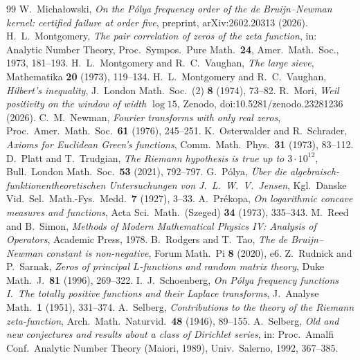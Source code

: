 \documentclass[11pt]{amsart}
\theoremstyle{definition}
\theoremstyle{remark}
\numberwithin{equation}{section}
\begin{document}
\begin{thebibliography}{99}
 W.~Micha{\l}owski, \emph{On the P\'olya frequency order of the de Bruijn--Newman kernel: certified failure at order five}, preprint, arXiv:2602.20313 (2026).
 H.~L.~Montgomery, \emph{The pair correlation of zeros of the zeta function}, in: Analytic Number Theory, Proc.\ Sympos.\ Pure Math.\ \textbf{24}, Amer.\ Math.\ Soc., 1973, 181--193.
 H.~L.~Montgomery and R.~C.~Vaughan, \emph{The large sieve}, Mathematika \textbf{20} (1973), 119--134.
 H.~L.~Montgomery and R.~C.~Vaughan, \emph{Hilbert's inequality}, J.\ London Math.\ Soc.\ (2) \textbf{8} (1974), 73--82.
 R.~Mori, \emph{Weil positivity on the window of width $\log 15$}, Zenodo, doi:10.5281/zenodo.23281236 (2026).
 C.~M.~Newman, \emph{Fourier transforms with only real zeros}, Proc.\ Amer.\ Math.\ Soc.\ \textbf{61} (1976), 245--251.
 K.~Osterwalder and R.~Schrader, \emph{Axioms for Euclidean Green's functions}, Comm.\ Math.\ Phys.\ \textbf{31} (1973), 83--112.
 D.~Platt and T.~Trudgian, \emph{The Riemann hypothesis is true up to $3\cdot10^{12}$}, Bull.\ London Math.\ Soc.\ \textbf{53} (2021), 792--797.
 G.~P\'olya, \emph{\"Uber die algebraisch-funktionentheoretischen Untersuchungen von J.~L.~W.~V.~Jensen}, Kgl.\ Danske Vid.\ Sel.\ Math.-Fys.\ Medd.\ \textbf{7} (1927), 3--33.
 A.~Pr\'ekopa, \emph{On logarithmic concave measures and functions}, Acta Sci.\ Math.\ (Szeged) \textbf{34} (1973), 335--343.
 M.~Reed and B.~Simon, \emph{Methods of Modern Mathematical Physics IV: Analysis of Operators}, Academic Press, 1978.
 B.~Rodgers and T.~Tao, \emph{The de Bruijn--Newman constant is non-negative}, Forum Math.\ Pi \textbf{8} (2020), e6.
 Z.~Rudnick and P.~Sarnak, \emph{Zeros of principal $L$-functions and random matrix theory}, Duke Math.\ J.\ \textbf{81} (1996), 269--322.
 I.~J.~Schoenberg, \emph{On P\'olya frequency functions I.\ The totally positive functions and their Laplace transforms}, J.\ Analyse Math.\ \textbf{1} (1951), 331--374.
 A.~Selberg, \emph{Contributions to the theory of the Riemann zeta-function}, Arch.\ Math.\ Naturvid.\ \textbf{48} (1946), 89--155.
 A.~Selberg, \emph{Old and new conjectures and results about a class of Dirichlet series}, in: Proc.\ Amalfi Conf.\ Analytic Number Theory (Maiori, 1989), Univ.\ Salerno, 1992, 367--385.

\end{thebibliography}
\end{document}
